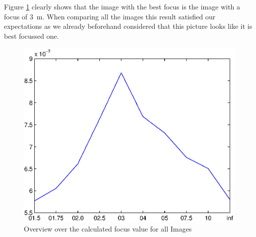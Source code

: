 \documentclass[
a4paper,     %
12pt         %
]{scrartcl}  %
\begin{document}
Figure \ref{fig:autofocus_hist} clearly shows that the image with the best focus is the image with a focus of \SI{3}{m}.
When comparing all the images this result satisfied our expectations as we already beforehand considered that this picture looks like it is best focussed one.

\begin{figure}[ht!]
 \centering
 \includegraphics{./Bildg_Messtechnik_Lab/Autofokus/html/main_01.eps}
 \caption{Overview over the calculated focus value for all Images}
 \label{fig:autofocus_hist}
\end{figure}
\end{document}
